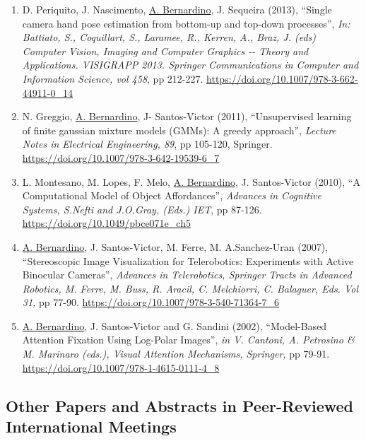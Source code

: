 \documentclass[
]{article}
\begin{document}
\begin{enumerate}
{  Serhat Aybat, El-hadi Zahzah (Eds), Chapman \& Hall/CRC}, 34 pages.
  ISBN:1498724620 9781498724623. \url{https://doi.org/10.1201/b20190}
  ~~~
\item
  D. Periquito, J. Nascimento, \ul{A. Bernardino}, J. Sequeira (2013),
  ``Single camera hand pose estimation from bottom-up and top-down
  processes'', \emph{In: Battiato, S., Coquillart, S., Laramee, R.,
  Kerren, A., Braz, J. (eds) Computer Vision, Imaging and Computer
  Graphics -\/- Theory and Applications. VISIGRAPP 2013. Springer
  Communications in Computer and Information Science, vol 458}, pp
  212-227. \url{https://doi.org/10.1007/978-3-662-44911-0_14}~~
\item
  N. Greggio, \ul{A. Bernardino}, J- Santos-Victor (2011),
  ``Unsupervised learning of finite gaussian mixture models (GMMs): A
  greedy approach'', \emph{Lecture Notes in Electrical Engineering, 89},
  pp 105-120, Springer.
  \url{https://doi.org/10.1007/978-3-642-19539-6_7}~
\item
  L. Montesano, M. Lopes, F. Melo, \ul{A. Bernardino}, J. Santos-Victor
  (2010), ``A Computational Model of Object Affordances'',
  \emph{Advances in Cognitive Systems, S.Nefti and J.O.Gray, (Eds.)
  IET}, pp 87-126. \url{https://doi.org/10.1049/pbce071e_ch5}~~
\item
  \ul{A. Bernardino}, J. Santos-Victor, M. Ferre, M. A.Sanchez-Uran
  (2007), ``Stereoscopic Image Visualization for Telerobotics:
  Experiments with Active Binocular Cameras'', \emph{Advances in
  Telerobotics, Springer Tracts in Advanced Robotics, M. Ferre, M. Buss,
  R. Aracil, C. Melchiorri, C. Balaguer, Eds. Vol 31,} pp 77-90.
  \url{https://doi.org/10.1007/978-3-540-71364-7_6}~~~
\item
  \ul{A. Bernardino}, J. Santos-Victor and G. Sandini (2002),
  ``Model-Based Attention Fixation Using Log-Polar Images'', \emph{in V.
  Cantoni, A. Petrosino \& M. Marinaro (eds.), Visual Attention
  Mechanisms, Springer,} pp 79-91.
  \url{https://doi.org/10.1007/978-1-4615-0111-4_8}~
\end{enumerate}

\subsection{Other Papers and Abstracts in Peer-Reviewed International
Meetings}\label{other-papers-and-abstracts-in-peer-reviewed-international-meetings}
\end{document}
